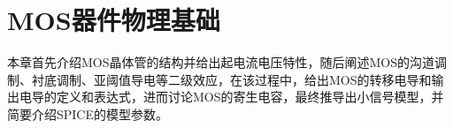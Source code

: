 \chapter{MOS器件物理基础}
本章首先介绍MOS晶体管的结构并给出起电流电压特性，随后阐述MOS的沟道调制、衬底调制、亚阈值导电等二级效应，在该过程中，给出MOS的转移电导和输出电导的定义和表达式，进而讨论MOS的寄生电容，最终推导出小信号模型，并简要介绍SPICE的模型参数。





